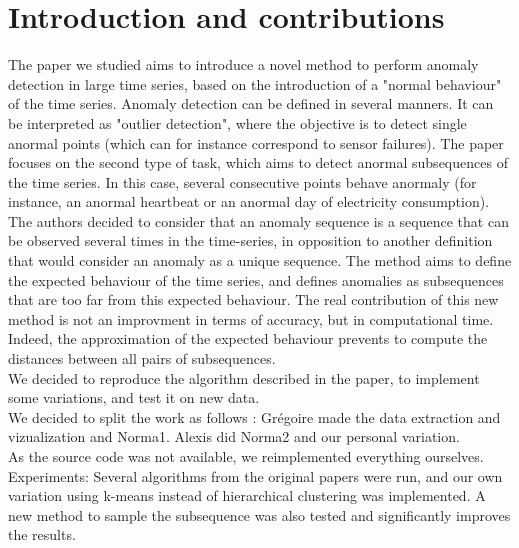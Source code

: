 \documentclass[11pt]{article}
\begin{document}
\section{Introduction and contributions}
The paper we studied aims to introduce a novel method to perform anomaly detection in large time series, based on the introduction of a "normal behaviour" of the time series.
Anomaly detection can be defined in several manners. 
It can be interpreted as "outlier detection", where the objective is to detect single anormal points (which can for instance correspond to sensor failures). 
The paper focuses on the second type of task, which aims to detect anormal subsequences of the time series. 
In this case, several consecutive points behave anormaly (for instance, an anormal heartbeat or an anormal day of electricity consumption).
The authors decided to consider that an anomaly sequence is a sequence that can be observed several times in the time-series, in opposition to another definition that would consider an anomaly as a unique sequence.
The method aims to define the expected behaviour of the time series, and defines anomalies as subsequences that are too far from this expected behaviour.
The real contribution of this new method is not an improvment in terms of accuracy, but in computational time. 
Indeed, the approximation of the expected behaviour prevents to compute the distances between all pairs of subsequences. \\[0.5cm]
We decided to reproduce the algorithm described in the paper, to implement some variations, and test it on new data. \\[0.5cm]
We decided to split the work as follows : Grégoire made the data extraction and vizualization and Norma1. Alexis did Norma2 and our personal variation. \\[0.5cm]
As the source code was not available, we reimplemented everything ourselves. \\[0.5cm]
Experiments: Several algorithms from the original papers were run, and our own variation using k-means instead of hierarchical clustering was implemented. 
A new method to sample the subsequence was also tested and significantly improves the results. \\[0.5cm]
\end{document}
